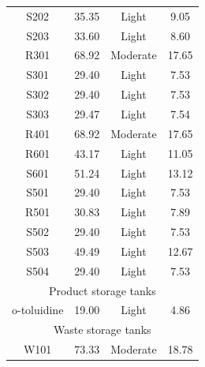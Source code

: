 \begin{table}[H]
\begin{tabular}{cccc}
S202                    & 35.35          & Light                     & 9.05                               \\
S203                    & 33.60          & Light                     & 8.60                               \\
R301                    & 68.92          & Moderate                  & 17.65                              \\
S301                    & 29.40          & Light                     & 7.53                               \\
S302                    & 29.40          & Light                     & 7.53                               \\
S303                    & 29.47          & Light                     & 7.54                               \\
R401                    & 68.92          & Moderate                  & 17.65                              \\
R601                    & 43.17          & Light                     & 11.05                              \\
S601                    & 51.24          & Light                     & 13.12                              \\
S501                    & 29.40          & Light                     & 7.53                               \\
R501                    & 30.83          & Light                     & 7.89                               \\
S502                    & 29.40          & Light                     & 7.53                               \\
S503                    & 49.49          & Light                     & 12.67                              \\
S504                    & 29.40          & Light                     & 7.53                               \\\hline
\multicolumn{4}{c}{Product   storage tanks}                                                      \\\hline
o-toluidine             & 19.00          & Light                     & 4.86                               \\\hline
\multicolumn{4}{c}{Waste   storage tanks}                                                        \\\hline
W101                    &   73.33           &     Moderate                      &   18.78                                 \\

\end{tabular}
\end{table}
